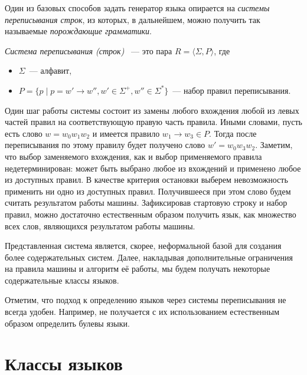 Один из базовых способов задать генератор языка опирается на \emph{системы переписывания строк}, из которых, в дальнейшем, можно получить так называемые \emph{порождающие грамматики}.

\begin{definition}
    \emph{Система переписывания (строк)}%
    ~---
    это пара $R = \langle \Sigma, P  \rangle$, где
    \begin{itemize}
        \item $\Sigma$~--- алфавит,
        \item $P= \{p \mid p = w' \to w'', w' \in \Sigma^+, w'' \in \Sigma^*\}$~--- набор правил переписывания.
    \end{itemize}
\end{definition}

Один шаг работы системы состоит из замены любого вхождения любой из левых частей правил на соответствующую правую часть правила.
Иными словами, пусть есть слово $w = w_0 w_1 w_2$ и имеется правило $w_1 \to w_3 \in P$.
Тогда после переписывания по этому правилу будет получено слово $w' = w_0 w_3 w_2$.
Заметим, что выбор заменяемого вхождения, как и выбор применяемого правила недетерминирован: может быть выбрано любое из вхождений и применено любое из доступных правил.
В качестве критерия остановки выберем невозможность применить ни одно из доступных правил.
Получившееся при этом слово будем считать результатом работы машины.
Зафиксировав стартовую строку и набор правил, можно достаточно естественным образом получить язык, как множество всех слов, являющихся результатом работы машины.

Представленная система является, скорее, неформальной базой для создания более содержательных систем.
Далее, накладывая дополнительные ограничения на правила машины и алгоритм её работы, мы будем получать некоторые содержательные классы языков.

Отметим, что подход к определению языков через системы переписывания не всегда удобен. Например, не получается с их использованием естественным образом определить булевы языки.

\section{Классы языков}

